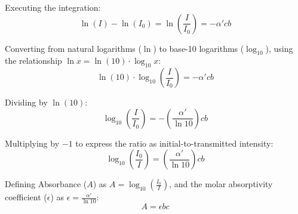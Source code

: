 \documentclass[11pt,a4paper]{article}
\begin{document}
Executing the integration:
\begin{equation}
\ln(I) - \ln(I_0) = \ln\left(\frac{I}{I_0}\right) = -\alpha' c b
\end{equation}

Converting from natural logarithms ($\ln$) to base-10 logarithms ($\log_{10}$), using the relationship $\ln x = \ln(10) \cdot \log_{10} x$:
\begin{equation}
\ln(10) \cdot \log_{10}\left(\frac{I}{I_0}\right) = -\alpha' c b
\end{equation}

Dividing by $\ln(10)$:
\begin{equation}
\log_{10}\left(\frac{I}{I_0}\right) = -\left(\frac{\alpha'}{\ln 10}\right) c b
\end{equation}

Multiplying by $-1$ to express the ratio as initial-to-transmitted intensity:
\begin{equation}
\log_{10}\left(\frac{I_0}{I}\right) = \left(\frac{\alpha'}{\ln 10}\right) c b
\end{equation}

Defining Absorbance ($A$) as $A = \log_{10}\left(\frac{I_0}{I}\right)$, and the molar absorptivity coefficient ($\epsilon$) as $\epsilon = \frac{\alpha'}{\ln 10}$:
\begin{equation}
A = \epsilon b c
\end{equation}

\end{document}
